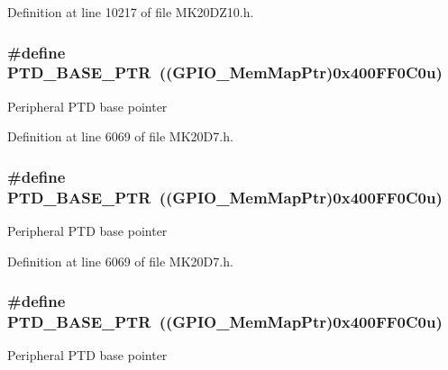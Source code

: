 Definition at line 10217 of file M\+K20\+D\+Z10.\+h.

\subsubsection[{\texorpdfstring{P\+T\+D\+\_\+\+B\+A\+S\+E\+\_\+\+P\+TR}{PTD_BASE_PTR}}]{\setlength{\rightskip}{0pt plus 5cm}\#define P\+T\+D\+\_\+\+B\+A\+S\+E\+\_\+\+P\+TR~(({\bf G\+P\+I\+O\+\_\+\+Mem\+Map\+Ptr})0x400\+F\+F0\+C0u)}\hypertarget{group___g_p_i_o___peripheral_gaa61d2c33375f3becbae1353eee4c1317}{}\label{group___g_p_i_o___peripheral_gaa61d2c33375f3becbae1353eee4c1317}
Peripheral P\+TD base pointer 

Definition at line 6069 of file M\+K20\+D7.\+h.

\subsubsection[{\texorpdfstring{P\+T\+D\+\_\+\+B\+A\+S\+E\+\_\+\+P\+TR}{PTD_BASE_PTR}}]{\setlength{\rightskip}{0pt plus 5cm}\#define P\+T\+D\+\_\+\+B\+A\+S\+E\+\_\+\+P\+TR~(({\bf G\+P\+I\+O\+\_\+\+Mem\+Map\+Ptr})0x400\+F\+F0\+C0u)}\hypertarget{group___g_p_i_o___peripheral_gaa61d2c33375f3becbae1353eee4c1317}{}\label{group___g_p_i_o___peripheral_gaa61d2c33375f3becbae1353eee4c1317}
Peripheral P\+TD base pointer 

Definition at line 6069 of file M\+K20\+D7.\+h.

\subsubsection[{\texorpdfstring{P\+T\+D\+\_\+\+B\+A\+S\+E\+\_\+\+P\+TR}{PTD_BASE_PTR}}]{\setlength{\rightskip}{0pt plus 5cm}\#define P\+T\+D\+\_\+\+B\+A\+S\+E\+\_\+\+P\+TR~(({\bf G\+P\+I\+O\+\_\+\+Mem\+Map\+Ptr})0x400\+F\+F0\+C0u)}\hypertarget{group___g_p_i_o___peripheral_gaa61d2c33375f3becbae1353eee4c1317}{}\label{group___g_p_i_o___peripheral_gaa61d2c33375f3becbae1353eee4c1317}
Peripheral P\+TD base pointer 

